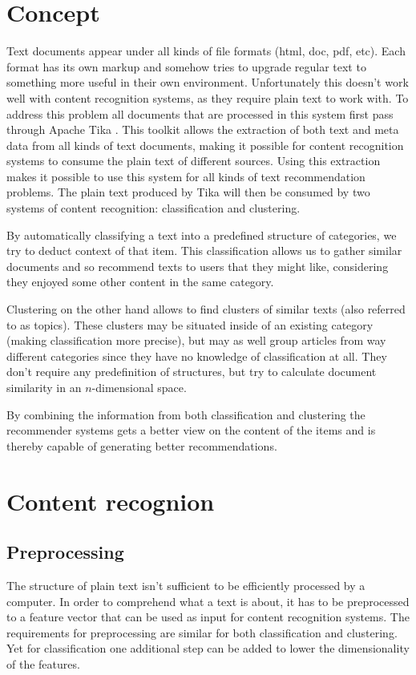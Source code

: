 \documentclass[twocolumn]{phdsymp} %
\begin{document}
\section{Concept}
Text documents appear under all kinds of file formats (html, doc, pdf, etc). Each format has its own markup and somehow tries to upgrade regular text to something more useful in their own environment. Unfortunately this doesn't work well with content recognition systems, as they require plain text to work with. To address this problem all documents that are processed in this system first pass through Apache Tika \cite{tika}. This toolkit allows the extraction of both text and meta data from all kinds of text documents, making it possible for content recognition systems to consume the plain text of different sources. Using this extraction makes it possible to use this system for all kinds of text recommendation problems. The plain text produced by Tika will then be consumed by two systems of content recognition: classification and clustering.

By automatically classifying a text into a predefined structure of categories, we try to deduct context of that item. This classification allows us to gather similar documents and so recommend texts to users that they might like, considering they enjoyed some other content in the same category.

Clustering on the other hand allows to find clusters of similar texts (also referred to as topics). These clusters may be situated inside of an existing category (making classification more precise), but may as well group articles from way different categories since they have no knowledge of classification at all. They don't require any predefinition of structures, but try to calculate document similarity in an $n$-dimensional space.

By combining the information from both classification and clustering the recommender systems gets a better view on the content of the items and is thereby capable of generating better recommendations.

\section{Content recognion}
\subsection{Preprocessing}
The structure of plain text isn't sufficient to be efficiently processed by a computer. In order to comprehend what a text is about, it has to be preprocessed to a feature vector that can be used as input for content recognition systems. The requirements for preprocessing are similar for both classification and clustering. Yet for classification one additional step can be added to lower the dimensionality of the features.
\end{document}
